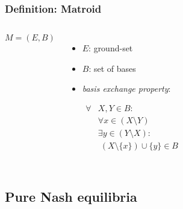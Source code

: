 \documentclass{beamer}
\begin{document}
\begin{frame}
  \frametitle{Definition: Matroid}
  \begin{columns}
    \begin{equation*}
      M = (E, B)
    \end{equation*}
    \vspace{-0.8cm}
    \begin{itemize}
      \item $E$: ground-set
      \item $B$: set of bases
      \item \emph{basis exchange property}:
        \vspace{-1cm}
        \begin{center}
          \begin{align*}
            \forall &X, Y\in B:\\
            &\forall x\in (X\setminus Y)\\
            &\exists y\in (Y\setminus X):\\
            &\;(X\setminus \{x\})\cup\{y\}\in B
          \end{align*}
        \end{center}
    \end{itemize}
  \end{columns}
\end{frame}

\subsection{Pure Nash equilibria}
\begin{frame}
\end{frame}
\end{document}
